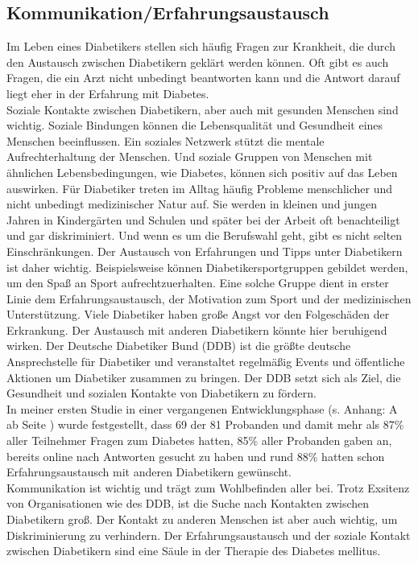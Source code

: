 \subsection{Kommunikation/Erfahrungsaustausch}
	Im Leben eines Diabetikers stellen sich häufig Fragen zur Krankheit, die durch den Austausch zwischen Diabetikern geklärt werden können. Oft gibt es auch Fragen, die ein Arzt nicht unbedingt beantworten kann und die Antwort darauf liegt eher in der Erfahrung mit Diabetes. \cite{JR}\\
	Soziale Kontakte zwischen Diabetikern, aber auch mit gesunden Menschen sind wichtig. Soziale Bindungen können die Lebensqualität und Gesundheit eines Menschen beeinflussen. Ein soziales Netzwerk stützt die mentale Aufrechterhaltung der Menschen. Und soziale Gruppen von Menschen mit ähnlichen Lebensbedingungen, wie Diabetes, können sich positiv auf das Leben auswirken. \newline
	Für Diabetiker treten im Alltag häufig Probleme menschlicher und nicht unbedingt medizinischer Natur auf. Sie werden in kleinen und jungen Jahren in Kindergärten und Schulen und später bei der Arbeit oft benachteiligt und gar diskriminiert. Und wenn es um die Berufswahl geht, gibt es nicht selten Einschränkungen. Der Austausch von Erfahrungen und Tipps unter Diabetikern ist daher wichtig. Beispielsweise können Diabetikersportgruppen gebildet werden, um den Spaß an Sport aufrechtzuerhalten. Eine solche Gruppe dient in erster Linie dem Erfahrungsaustausch, der Motivation zum Sport und der medizinischen Unterstützung. Viele Diabetiker haben große Angst vor den Folgeschäden der Erkrankung. Der Austausch mit anderen Diabetikern könnte hier beruhigend wirken. \cite{SG}\newline
	Der Deutsche Diabetiker Bund (DDB) ist die größte deutsche Ansprechstelle für Diabetiker und veranstaltet regelmäßig Events und öffentliche Aktionen um Diabetiker zusammen zu bringen. Der DDB setzt sich als Ziel, die Gesundheit und sozialen Kontakte von Diabetikern zu fördern. \cite{JR}\\
	In meiner ersten Studie in einer vergangenen Entwicklungsphase (s. Anhang: A  ab Seite \pageref{section:Evaluation}) wurde festgestellt, dass 69 der 81 Probanden und damit mehr als 87\% aller Teilnehmer Fragen zum Diabetes hatten, 85\% aller Probanden gaben an, bereits online nach Antworten gesucht zu haben und rund 88\% hatten schon Erfahrungsaustausch mit anderen Diabetikern gewünscht.\\
	Kommunikation ist wichtig und trägt zum Wohlbefinden aller bei. Trotz Exsitenz von Organisationen wie des DDB, ist die Suche nach Kontakten zwischen Diabetikern groß. Der Kontakt zu anderen Menschen ist aber auch wichtig, um Diskriminierung zu verhindern. Der Erfahrungsaustausch und der soziale Kontakt zwischen Diabetikern sind eine Säule in der Therapie des Diabetes mellitus.
